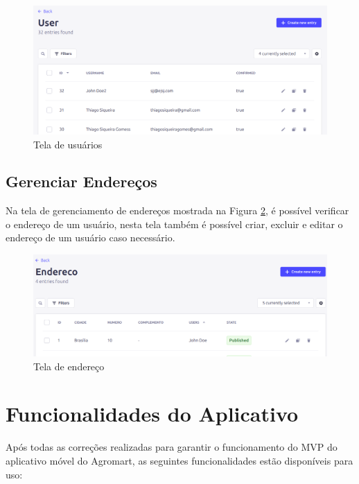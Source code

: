 \begin{figure}[h]
	\centering
	\includegraphics[keepaspectratio=true,scale=0.28]{figuras/painel_usuarios.png}
	\caption{Tela de usuários}
        \label{tela-usuarios-cms}
\end{figure}

\subsection{Gerenciar Endereços}
Na tela de gerenciamento de endereços mostrada na Figura \ref{tela-endereco-cms}, é possível verificar o endereço de um usuário, nesta tela também é possível criar, excluir e editar o endereço de um usuário caso necessário.

\begin{figure}[h]
	\centering
	\includegraphics[keepaspectratio=true,scale=0.28]{figuras/painel_endereco.png}
	\caption{Tela de endereço}
        \label{tela-endereco-cms}
\end{figure}

\section{Funcionalidades do Aplicativo}
Após todas as correções realizadas para garantir o funcionamento do MVP do aplicativo móvel do Agromart, as seguintes funcionalidades estão disponíveis para uso:

